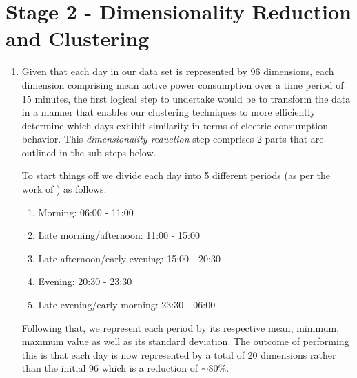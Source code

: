 \section{Stage 2 - Dimensionality Reduction and Clustering}
\label{sec:Methodology:Stage-2}
\begin{adjustwidth}{-1.65cm}{-0.0cm}%
    \begin{enumerate}[label=Step 2.\arabic*:, leftmargin=*]
    \setlength\itemsep{1em}
        \item Given that each day in our data set is represented by 96 dimensions, each dimension comprising mean active power consumption over a time period of 15 minutes, the first logical step to undertake would be to transform the data in a manner that enables our clustering techniques to more efficiently determine which days exhibit similarity in terms of electric consumption behavior. This \textit{dimensionality reduction} step comprises 2 parts that are outlined in the sub-steps below.
        
        \noindent \newline To start things off we divide each day into 5 different periods (as per the work of \citet{Yildiz}) as follows:
            \begin{enumerate}[label=\arabic*:, leftmargin=.75cm]
                \item Morning: 06:00 - 11:00
                \item Late morning/afternoon: 11:00 - 15:00
                \item Late afternoon/early evening: 15:00 - 20:30
                \item Evening: 20:30 - 23:30
                \item Late evening/early morning: 23:30 - 06:00
            \end{enumerate}
        
        \noindent \newline Following that, we represent each period by its respective mean, minimum, maximum value as well as its standard deviation. The outcome of performing this is that each day is now represented by a total of 20 dimensions rather than the initial 96 which is a reduction of $\sim 80\%$.
        

\end{enumerate}
\end{adjustwidth}
